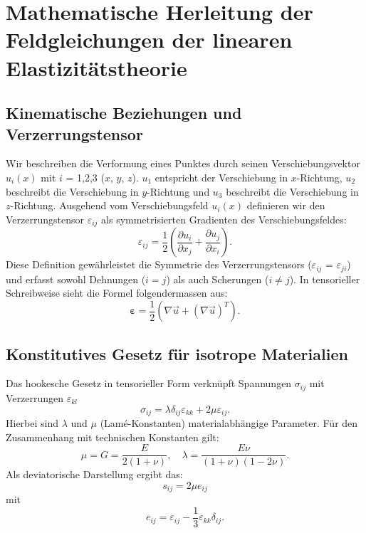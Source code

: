 %
%
%
%
\section{Mathematische Herleitung der Feldgleichungen der
linearen Elastizitätstheorie}
\label{elastomechanik:section:herleitung2}

\subsection{Kinematische Beziehungen und Verzerrungstensor}
Wir beschreiben die Verformung eines Punktes durch seinen
Verschiebungsvektor $u_i(x)$ mit $i$ = 1,2,3 ($x$, $y$, $z$).
$u_1$ entspricht der Verschiebung in $x$-Richtung, $u_2$ beschreibt
die Verschiebung in $y$-Richtung und $u_3$ beschreibt die Verschiebung
in $z$-Richtung.
Ausgehend vom Verschiebungsfeld $u_i(x)$ definieren wir den
Verzerrungstensor $\varepsilon_{ij}$ als symmetrisierten Gradienten
des Verschiebungsfeldes:
\begin{equation*}
	\varepsilon_{ij} = 
	\frac{1}{2} \left( \frac{\partial u_i}{\partial x_j} + \frac{\partial u_j}{\partial x_i} \right).
\end{equation*}
Diese Definition gewährleistet die Symmetrie des Verzerrungstensors
($\varepsilon_{ij}$ = $\varepsilon_{ji}$) und erfasst sowohl Dehnungen
($i = j$) als auch Scherungen ($i \neq j$).
In tensorieller Schreibweise sieht die Formel folgendermassen aus:
\begin{equation*}
	\boldsymbol{\varepsilon} = 
	\frac{1}{2} \left( \nabla \vec{u} + (\nabla \vec{u})^T \right).
\end{equation*}

\subsection{Konstitutives Gesetz für isotrope Materialien
\label{elastomechanik:math:subsection:isotrop}}
Das hookesche Gesetz in tensorieller Form verknüpft Spannungen
$\sigma_{ij}$ mit Verzerrungen $\varepsilon_{kl}$
\begin{equation}
	\sigma_{ij} = 
	\lambda \delta_{ij} \varepsilon_{kk} + 2\mu \varepsilon_{ij}.
\label{elastomechanik:math:eqn:materialgesetz}
\end{equation}
Hierbei sind $\lambda$ und $\mu$ (Lamé-Konstanten) materialabhängige
Parameter.
Für den Zusammenhang mit technischen Konstanten gilt:
\begin{equation*}
	\mu = 
	G = 
	\frac{E}{2(1+\nu)}, \quad \lambda = 
	\frac{E \nu}{(1+\nu)(1-2\nu)}.
\end{equation*}	
Als deviatorische Darstellung ergibt das:
\begin{equation*}
	s_{ij} =
	2\mu e_{ij}
\end{equation*}
mit
\begin{equation*}
	e_{ij} = 
	\varepsilon_{ij} - \frac{1}{3} \varepsilon_{kk} \delta_{ij}.
\end{equation*}

